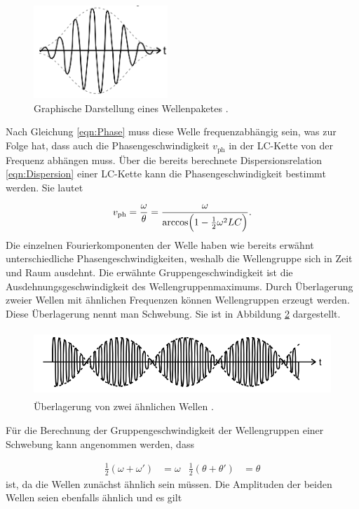 \begin{figure}
  \centering
  \includegraphics[height = 3.5cm]{Wellengruppe.png}
  \caption{Graphische Darstellung eines Wellenpaketes \cite{anleitung}.}
  \label{fig:WP}
\end{figure}

Nach Gleichung \eqref{eqn:Phase}
muss diese Welle frequenzabhängig sein, was zur Folge hat, dass auch die
Phasengeschwindigkeit $v_\text{ph}$ in der LC-Kette von der Frequenz abhängen
muss.
Über die bereits berechnete Dispersionsrelation \eqref{eqn:Dispersion} einer
LC-Kette kann die Phasengeschwindigkeit bestimmt werden.
Sie lautet

\begin{equation}
  v_\text{ph} = \frac{\omega}{\theta} = \frac{\omega}{\arccos \Bigl(
  1-\frac{1}{2}\omega^2LC\Bigr)}.
\end{equation}
Die einzelnen Fourierkomponenten der Welle haben wie bereits erwähnt
unterschiedliche Phasengeschwindigkeiten, weshalb die Wellengruppe sich in Zeit
und Raum ausdehnt. Die erwähnte Gruppengeschwindigkeit ist die
Ausdehnungsgeschwindigkeit des Wellengruppenmaximums.
Durch Überlagerung zweier Wellen mit ähnlichen Frequenzen können Wellengruppen
erzeugt werden. Diese Überlagerung nennt man Schwebung. Sie ist in Abbildung
\ref{fig:Schweb} dargestellt.

\begin{figure}
  \centering
  \includegraphics[height = 2.5cm]{Schwebung.png}
  \caption{Überlagerung von zwei ähnlichen Wellen \cite{anleitung}.}
  \label{fig:Schweb}
\end{figure}

Für die Berechnung der Gruppengeschwindigkeit der Wellengruppen einer Schwebung
kann angenommen werden, dass

\begin{align}
\frac{1}{2}(\omega + \omega') & = \omega & \frac{1}{2}(\theta + \theta') &
= \theta
\label{eqn:SchwebungBedingung}
\end{align}
ist, da die Wellen zunächst ähnlich sein müssen.
Die Amplituden der beiden Wellen seien ebenfalls ähnlich und es gilt

